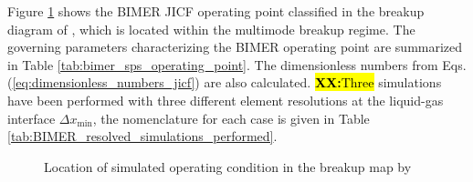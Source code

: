 
Figure \ref{fig:location_BIMER_op_in_breakup_map} shows the BIMER JICF operating point classified in the breakup diagram of \citeColor[wu_breakup_1997], which is located within the multimode breakup regime. The governing parameters characterizing the BIMER operating point are summarized in Table \ref{tab:bimer_sps_operating_point}. The dimensionless numbers from Eqs. (\ref{eq:dimensionless_numbers_jicf}) are also calculated. \hl{\textbf{XX:}Three} simulations have been performed with three different element resolutions at the liquid-gas interface $\Delta x_\mathrm{min}$, the nomenclature for each case is given in Table \ref{tab:BIMER_resolved_simulations_performed}.

\begin{figure}[ht]
     \centering
     \vspace*{-0.1in}
     \caption{Location of simulated operating condition in the breakup map by \citeColor[wu_breakup_1997]}
      \label{fig:location_BIMER_op_in_breakup_map}
\end{figure}

